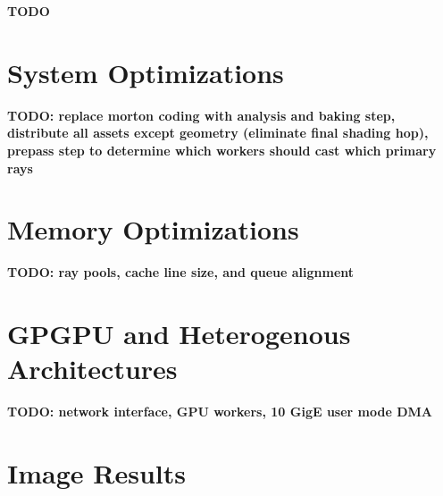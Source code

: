 \documentclass[12pt]{ucthesis}
\begin{document}
\textbf{TODO}

\section{System Optimizations}
\label{optimizations}

\textbf{TODO: replace morton coding with analysis and baking step, distribute all assets except geometry (eliminate final shading hop), prepass step to determine which workers should cast which primary rays}

\section{Memory Optimizations}
\label{memory}

\textbf{TODO: ray pools, cache line size, and queue alignment}

\section{GPGPU and Heterogenous Architectures}
\label{hetergenous}

\textbf{TODO: network interface, GPU workers, 10 GigE user mode DMA}

\clearpage



\section*{Image Results}
\end{document}
